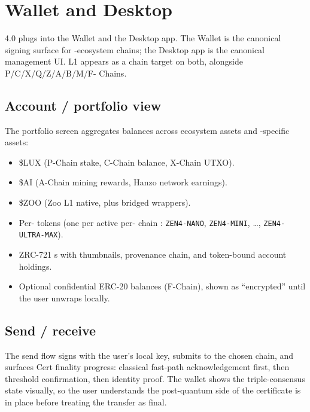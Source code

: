 \section{\Lux{} Wallet and Desktop}
\label{sec:wallet-desktop}

\Zoo{} 4.0 plugs into the \Lux{} Wallet and the \Lux{} Desktop app. The
\Lux{} Wallet is the canonical signing surface for \Lux{}-ecosystem
chains; the \Lux{} Desktop app is the canonical management UI. \Zoo{}
L1 appears as a chain target on both, alongside \Lux{} P/C/X/Q/Z/A/B/M/F-
Chains.

\subsection{Account / portfolio view}

The portfolio screen aggregates balances across \Lux{} ecosystem
assets and \Zoo{}-specific assets:

\begin{itemize}[leftmargin=1.2em]
  \item \$LUX (P-Chain stake, C-Chain balance, X-Chain UTXO).
  \item \$AI (A-Chain mining rewards, Hanzo network earnings).
  \item \$ZOO (Zoo L1 native, plus bridged wrappers).
  \item Per-\LLM{} tokens (one per active per-\LLM{} chain
        \cite{zoo-per-llm-chains}: \texttt{ZEN4-NANO}, \texttt{ZEN4-MINI},
        \dots, \texttt{ZEN4-ULTRA-MAX}).
  \item ZRC-721 \NFT{}s with thumbnails, provenance chain, and
        token-bound account holdings.
  \item Optional confidential ERC-20 balances (F-Chain), shown as
        ``encrypted'' until the user unwraps locally.
\end{itemize}

\subsection{Send / receive}

The send flow signs with the user's local key, submits to the chosen
chain, and surfaces \Quasar{}Cert finality progress: classical
fast-path acknowledgement first, then \Ringtail{} threshold
confirmation, then \MLDSA{} identity proof. The wallet shows the
triple-consensus state visually, so the user understands the
post-quantum side of the certificate is in place before treating
the transfer as final.

